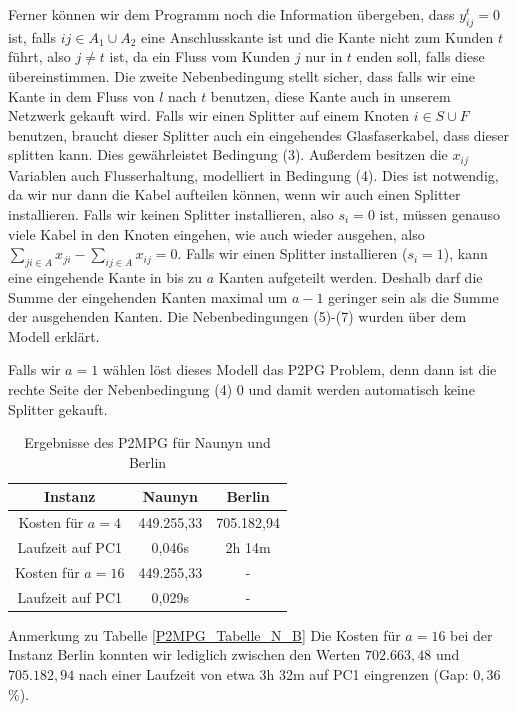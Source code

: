 \documentclass[11pt,a4paper]{article}
\theoremstyle{my_th_style1}
\begin{document}
Ferner k\"onnen wir dem Programm noch die Information \"ubergeben, dass \(y_{ij}^t = 0\) ist, falls \(ij \in A_1 \cup A_2\) eine Anschlusskante ist und die Kante nicht zum Kunden \(t\) f\"uhrt, also \(j \neq t\) ist, da ein Fluss vom Kunden \(j\) nur in \(t\) enden soll, falls diese \"ubereinstimmen.
Die zweite Nebenbedingung stellt sicher, dass falls wir eine Kante in dem Fluss von $l$ nach $t$ benutzen, diese Kante auch in unserem Netzwerk gekauft wird.
Falls wir einen Splitter auf einem Knoten $i \in S \cup F$ benutzen, braucht dieser Splitter auch ein eingehendes Glasfaserkabel, dass dieser splitten kann.
Dies gewährleistet Bedingung (3).
Außerdem besitzen die $x_{ij}$ Variablen auch Flusserhaltung, modelliert in Bedingung (4).
Dies ist notwendig, da wir nur dann die Kabel aufteilen können, wenn wir auch einen Splitter installieren.
Falls wir keinen Splitter installieren, also $s_i=0$ ist, müssen genauso viele Kabel in den Knoten eingehen, wie auch wieder ausgehen, also $\displaystyle\sum_{ji \in A} x_{ji} - \displaystyle\sum_{ij \in A} x_{ij}=0$.
Falls wir einen Splitter installieren ($s_i=1$), kann eine eingehende Kante in bis zu $a$ Kanten aufgeteilt werden.
Deshalb darf die Summe der eingehenden Kanten maximal um \(a-1\) geringer sein als die Summe der ausgehenden Kanten.
Die Nebenbedingungen (5)-(7) wurden über dem Modell erklärt.
  
Falls wir $a=1$ w\"ahlen l\"ost dieses Modell das P2PG Problem, denn dann ist die rechte Seite der Nebenbedingung (4) 0 und damit werden automatisch keine Splitter gekauft.
 
 \begin{table}[h]
 	\centering
 	\begin{tabular}{c|c|c}
 		Instanz & Naunyn & Berlin \\	
 		\hline
 		 Kosten für $a=4$ & 449.255,33 & 705.182,94 \\
 		 Laufzeit auf PC1 & 0,046s & 2h 14m \\
 		 \hline
 		Kosten für $a=16$ & 449.255,33 & - \\
 		Laufzeit auf PC1 & 0,029s & - \\
 	\end{tabular}
 	\caption{Ergebnisse des P2MPG f\"ur Naunyn und Berlin}
 	\label{P2MPG_Tabelle_N_B}
 \end{table}
 
 Anmerkung zu Tabelle \eqref{P2MPG_Tabelle_N_B} Die Kosten f\"ur \(a=16\) bei der Instanz Berlin konnten wir lediglich zwischen den Werten \(702.663,48\) und \(705.182,94\) nach einer Laufzeit von etwa 3h 32m auf PC1 eingrenzen (Gap: \(0,36\) \%).
 
\end{document}
